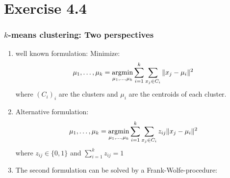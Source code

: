 \documentclass[10pt,aspectratio=169,handout]{beamer}
\begin{document}
\section{Exercise 4.4}

\begin{frame}
    \frametitle{$k$-means clustering: Two perspectives}

    \begin{enumerate}
        \item well known formulation: Minimize:\[\mu_1,\dots,\mu_k=\operatorname*{argmin}_{\mu_1,\dots,\mu_k} \sum_{i=1}^k\sum_{x_j\in C_i} \Vert x_j-\mu_i\Vert^2\]
        where $(C_i)_i$ are the clusters and $\mu_i$ are the centroids of each cluster.
        \item Alternative formulation: \[\mu_1,\dots,\mu_k=\operatorname*{argmin}_{\mu_1,\dots,\mu_k} \sum_{i=1}^k\sum_{x_j\in C_i} z_{ij}\Vert x_j-\mu_i\Vert^2\]
        where $z_{ij}\in\{0,1\}$ and $\sum_{i=1}^{k}z_{ij}=1$
        \item  The second formulation can be solved by a Frank-Wolfe-procedure:
    \end{enumerate}

\end{frame}

\begin{frame}

    \inputminted[bgcolor=LightGray,fontsize=\small]{python}{code/fw_kmeans_v1.py}
    \vspace{-5mm}
    \inputminted[bgcolor=LightGray,fontsize=\small]{python}{code/fw_update_z.py}

\end{frame}
\end{document}
